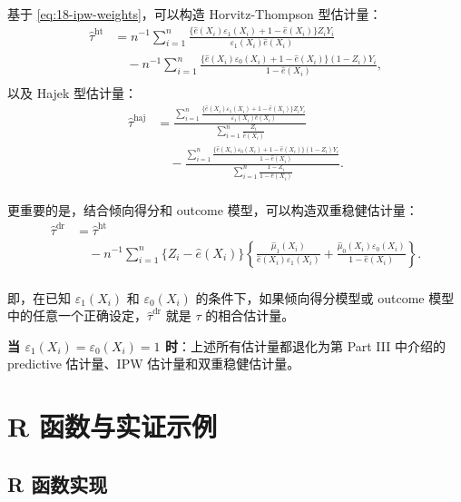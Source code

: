 基于 \cref{eq:18-ipw-weights}，可以构造 Horvitz-Thompson 型估计量：
\begin{align}
\hat{\tau}^{\mathrm{ht}} &= n^{-1}\sum_{i=1}^n \frac{\{\hat{e}(X_i)\varepsilon_1(X_i) + 1 - \hat{e}(X_i)\}Z_i Y_i}{\varepsilon_1(X_i)\hat{e}(X_i)} \label{eq:18-tau-ht} \\
&\quad - n^{-1}\sum_{i=1}^n \frac{\{\hat{e}(X_i)\varepsilon_0(X_i) + 1 - \hat{e}(X_i)\}(1-Z_i)Y_i}{1 - \hat{e}(X_i)} , \\
\end{align}
以及 Hajek 型估计量：
\begin{align}
\hat{\tau}^{\mathrm{haj}} &= \frac{\sum_{i=1}^n \frac{\{\hat{e}(X_i)\varepsilon_1(X_i) + 1 - \hat{e}(X_i)\}Z_i Y_i}{\varepsilon_1(X_i)\hat{e}(X_i)}}{\sum_{i=1}^n \frac{Z_i}{\hat{e}(X_i)}} \label{eq:18-tau-haj} \\
&\quad - \frac{\sum_{i=1}^n \frac{\{\hat{e}(X_i)\varepsilon_0(X_i) + 1 - \hat{e}(X_i)\}(1-Z_i)Y_i}{1 - \hat{e}(X_i)}}{\sum_{i=1}^n \frac{1-Z_i}{1-\hat{e}(X_i)}} . \\
\end{align}

更重要的是，结合倾向得分和 outcome 模型，可以构造双重稳健估计量：
\begin{align}
\hat{\tau}^{\mathrm{dr}} &= \hat{\tau}^{\mathrm{ht}} \label{eq:18-tau-dr} \\
&\quad - n^{-1}\sum_{i=1}^n \{Z_i - \hat{e}(X_i)\}\left\{\frac{\hat{\mu}_1(X_i)}{\hat{e}(X_i)\varepsilon_1(X_i)} + \frac{\hat{\mu}_0(X_i)\varepsilon_0(X_i)}{1-\hat{e}(X_i)}\right\} . \\
\end{align}

即，在已知 $\varepsilon_1(X_i)$ 和 $\varepsilon_0(X_i)$ 的条件下，如果倾向得分模型或 outcome 模型中的任意一个正确设定，$\hat{\tau}^{\mathrm{dr}}$ 就是 $\tau$ 的相合估计量。

\textbf{当 $\varepsilon_1(X_i) = \varepsilon_0(X_i) = 1$ 时}：上述所有估计量都退化为第 Part III 中介绍的 predictive 估计量、IPW 估计量和双重稳健估计量。

\section{R 函数与实证示例}\label{sec:18-example}

\subsection{R 函数实现}\label{sec:18-r-functions}

